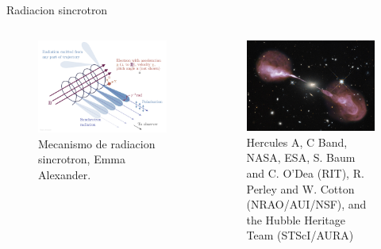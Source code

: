 \documentclass[xetex,aspectratio=169]{beamer}
\begin{document}
	\begin{frame}{Radiacion sincrotron}
		\begin{columns}
			
			\begin{column}{0.48\textwidth}
				\begin{figure}
					\includegraphics[width=\textwidth, keepaspectratio]{./figures/synchrotron/synchrotron.png}
					\caption*{Mecanismo de radiacion sincrotron, Emma Alexander.}
				\end{figure}
			\end{column}
			
			\begin{column}{0.48\textwidth}
				\begin{figure}
					\includegraphics[width=\textwidth, keepaspectratio]{./figures/synchrotron/hercA.jpg}
					\caption*{Hercules A, C Band, NASA, ESA, S. Baum and C. O'Dea (RIT), R. Perley and W. Cotton (NRAO/AUI/NSF), and the Hubble Heritage Team (STScI/AURA)}
				\end{figure}
				
				
			\end{column}
		\end{columns}
	\end{frame}
	
\end{document}
